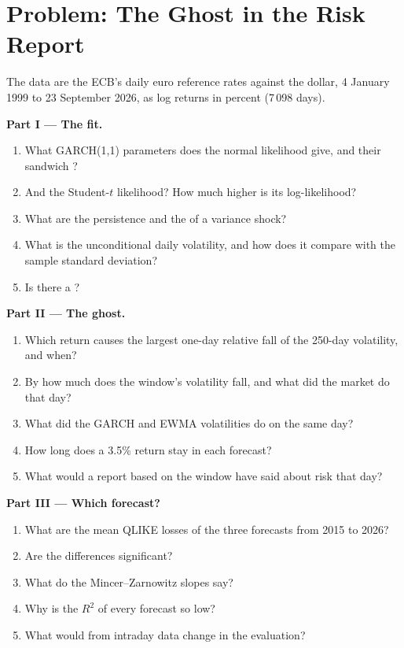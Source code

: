 \section{Problem: The Ghost in the Risk Report}

\begin{problem}\label{pb:qm:volatility-models:1}
The data are the ECB's daily euro reference rates against the dollar, 4 January 1999 to 23 September 2026, as log returns in percent (7\,098 days).

\medskip\noindent\textbf{Part I --- The fit.}
\begin{enumerate}
\item What GARCH(1,1) parameters does the normal likelihood give, and their sandwich ?
\item And the Student-$t$ likelihood? How much higher is its log-likelihood?
\item What are the persistence and the  of a variance shock?
\item What is the unconditional daily volatility, and how does it compare with the sample standard deviation?
\item Is there a ?
\end{enumerate}

\medskip\noindent\textbf{Part II --- The ghost.}
\begin{enumerate}[resume]
\item Which return causes the largest one-day relative fall of the 250-day volatility, and when?
\item By how much does the window's volatility fall, and what did the market do that day?
\item What did the GARCH and EWMA volatilities do on the same day?
\item How long does a 3.5\% return stay in each forecast?
\item What would a report based on the window have said about risk that day?
\end{enumerate}

\medskip\noindent\textbf{Part III --- Which forecast?}
\begin{enumerate}[resume]
\item What are the mean QLIKE losses of the three forecasts from 2015 to 2026?
\item Are the differences significant?
\item What do the Mincer--Zarnowitz slopes say?
\item Why is the $R^2$ of every forecast so low?
\item What would  from intraday data change in the evaluation?
\end{enumerate}


\end{problem}
